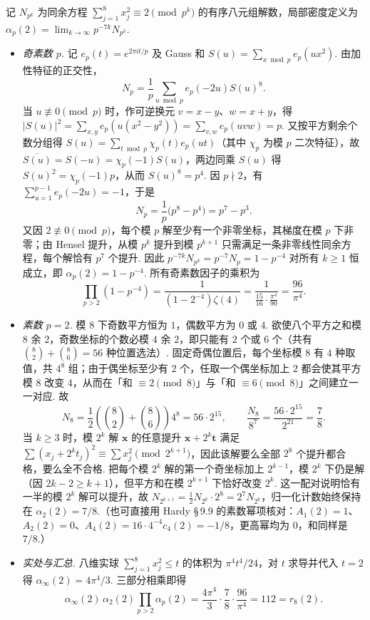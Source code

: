 记 $N_{p^k}$ 为同余方程 $\sum_{j=1}^{8}x_j^2\equiv 2\pmod{p^k}$ 的有序八元组解数，局部密度定义为 $\alpha_p(2)=\lim_{k\to\infty}p^{-7k}N_{p^k}$.

\begin{itemize}
\item \emph{奇素数 $p$.} 记 $e_p(t)=e^{2\pi it/p}$ 及 Gauss 和 $S(u)=\sum_{x\bmod p}e_p(ux^2)$. 由加性特征的正交性，
\[
N_p=\frac{1}{p}\sum_{u\bmod p}e_p(-2u)S(u)^8.
\]
当 $u\not\equiv 0\pmod p$ 时，作可逆换元 $v=x-y$、$w=x+y$，得 $|S(u)|^2=\sum_{x,y}e_p(u(x^2-y^2))=\sum_{v,w}e_p(uvw)=p$. 又按平方剩余个数分组得 $S(u)=\sum_{t\bmod p}\chi_p(t)e_p(ut)$（其中 $\chi_p$ 为模 $p$ 二次特征），故 $\overline{S(u)}=S(-u)=\chi_p(-1)S(u)$，两边同乘 $S(u)$ 得 $S(u)^2=\chi_p(-1)p$，从而 $S(u)^8=p^4$. 因 $p\nmid 2$，有 $\sum_{u=1}^{p-1}e_p(-2u)=-1$，于是
\[
N_p=\frac{1}{p}\bigl(p^8-p^4\bigr)=p^7-p^3.
\]
又因 $2\not\equiv 0\pmod p$，每个模 $p$ 解至少有一个非零坐标，其梯度在模 $p$ 下非零；由 Hensel 提升，从模 $p^k$ 提升到模 $p^{k+1}$ 只需满足一条非零线性同余方程，每个解恰有 $p^7$ 个提升. 因此 $p^{-7k}N_{p^k}=p^{-7}N_p=1-p^{-4}$ 对所有 $k\ge 1$ 恒成立，即 $\alpha_p(2)=1-p^{-4}$. 所有奇素数因子的乘积为
\[
\prod_{p>2}(1-p^{-4})=\frac{1}{(1-2^{-4})\zeta(4)}=\frac{1}{\frac{15}{16}\cdot\frac{\pi^4}{90}}=\frac{96}{\pi^4}.
\]

\item \emph{素数 $p=2$.} 模 $8$ 下奇数平方恒为 $1$，偶数平方为 $0$ 或 $4$. 欲使八个平方之和模 $8$ 余 $2$，奇数坐标的个数必模 $4$ 余 $2$，即只能有 $2$ 个或 $6$ 个（共有 $\binom{8}{2}+\binom{8}{6}=56$ 种位置选法）. 固定奇偶位置后，每个坐标模 $8$ 有 $4$ 种取值，共 $4^8$ 组；由于偶坐标至少有 $2$ 个，任取一个偶坐标加上 $2$ 都会使其平方模 $8$ 改变 $4$，从而在「和 $\equiv 2\pmod 8$」与「和 $\equiv 6\pmod 8$」之间建立一一对应. 故
\[
N_8=\frac{1}{2}\left(\binom{8}{2}+\binom{8}{6}\right)4^8=56\cdot 2^{15}, \qquad \frac{N_8}{8^7}=\frac{56\cdot 2^{15}}{2^{21}}=\frac{7}{8}.
\]
当 $k\ge 3$ 时，模 $2^k$ 解 $\mathbf x$ 的任意提升 $\mathbf x+2^k\mathbf t$ 满足 $\sum(x_j+2^k t_j)^2\equiv\sum x_j^2\pmod{2^{k+1}}$，因此该解要么全部 $2^8$ 个提升都合格，要么全不合格. 把每个模 $2^k$ 解的第一个奇坐标加上 $2^{k-1}$，模 $2^k$ 下仍是解（因 $2k-2\ge k+1$），但平方和在模 $2^{k+1}$ 下恰好改变 $2^k$. 这一配对说明恰有一半的模 $2^k$ 解可以提升，故 $N_{2^{k+1}}=\tfrac{1}{2}N_{2^k}\cdot 2^8=2^7 N_{2^k}$，归一化计数始终保持在 $\alpha_2(2)=7/8$.（也可直接用 Hardy \S\,9.9 的素数幂项核对：$A_1(2)=1$、$A_2(2)=0$、$A_4(2)=16\cdot 4^{-4}c_4(2)=-1/8$，更高幂均为 $0$，和同样是 $7/8$.）

\item \emph{实处与汇总.} 八维实球 $\sum_{j=1}^{8}x_j^2\le t$ 的体积为 $\pi^4 t^4/24$，对 $t$ 求导并代入 $t=2$ 得 $\alpha_\infty(2)=4\pi^4/3$. 三部分相乘即得
\[
\alpha_\infty(2)\,\alpha_2(2)\prod_{p>2}\alpha_p(2)=\frac{4\pi^4}{3}\cdot\frac{7}{8}\cdot\frac{96}{\pi^4}=112=r_8(2).
\]
\end{itemize}


